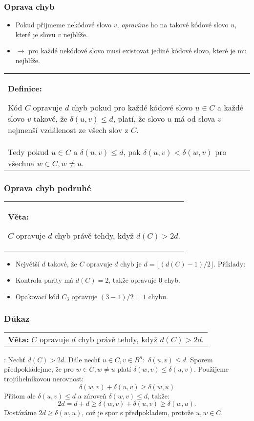 \documentclass{beamer}
\newenvironment{definice}
{
    \begin{center}
    \begin{tabular}{p{9cm}}
    \textbf{Definice:}
}
{
    \end{tabular}
    \end{center}
}
\newenvironment{veta}
{
    \begin{center}
    \begin{tabular}{p{9cm}}
    \textbf{Věta:}
}
{
    \end{tabular}
    \end{center}
}
\newenvironment{itemizex}%
  {\large \begin{itemize}%
    \setlength{\itemsep}{8pt}%
    \setlength{\parskip}{8pt}}%
  {\end{itemize}}
\begin{document}
\begin{frame}[t,fragile]\frametitle{Oprava chyb} 
    \begin{itemizex}
        \item Pokud přijmeme nekódové slovo $v$, \textit{opravíme} ho na takové kódové slovo $u$, které je slovu $v$ nejblíže. 
        \item $\longrightarrow$ pro každé nekódové slovo musí existovat jediné kódové slovo, které je mu nejblíže. 
    \end{itemizex}

\begin{definice}
Kód $C$ opravuje $d$ chyb pokud pro každé kódové slovo $u\in C$ a každé slovo $v$ takové, že $\delta(u, v) \le d$, platí, že slovo $u$ má od slova $v$ nejmenší vzdálenost ze všech slov z $C$. \\Tedy pokud $u\in C$ a $\delta(u,v)\le d$, pak $\delta(u,v)<\delta(w,v)$ pro všechna $w\in C, w\ne u$.
\end{definice}
\end{frame}


\begin{frame}[t,fragile]\frametitle{Oprava chyb podruhé} 
\begin{veta}
$C$ opravuje $d$ chyb právě tehdy, když $d(C)>2d$.
\end{veta}

\begin{itemizex}
    \item Největší $d$ takové, že $C$ opravuje $d$ chyb je $d=\lfloor(d(C)-1)/2\rfloor$. Příklady:
    \item Kontrola parity má $d(C)=2$, takže opravuje 0 chyb. 
    \item Opakovací kód $C_3$ opravuje $(3-1)/2=1$ chybu.
\end{itemizex}
\end{frame}



\begin{frame}[t,fragile]\frametitle{Důkaz} 
\begin{veta}$C$ opravuje $d$ chyb právě tehdy, když $d(C)>2d$.\end{veta}
\uv{$\Leftarrow$}: Nechť $d(C)>2d$. Dále nechť $u\in C, v\in B^n:$ $\delta(u,v)\le d$. Sporem předpokládejme, že pro $w\in C, w\ne u$ platí $\delta(w,v)\le\delta(u,v)$. Použijeme trojúhelníkovou nerovnost:
$$
\delta(w,v)+\delta(u,v)\ge\delta(w,u)
$$
Přitom ale $\delta(u,v)\le d$ a zároveň $\delta(w,v)\le d$, takže:
$$
2d=d+d\ge\delta(w,v)+\delta(u,v)\ge\delta(w,u).
$$
Dostáváme $2d\ge\delta(w,u)$, což je spor s předpokladem, protože $u,w\in C$.
\end{frame}
\end{document}
